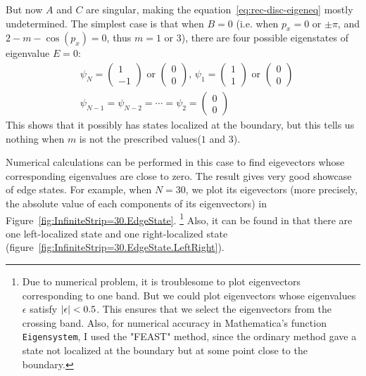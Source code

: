 \documentclass{article}
\begin{document}
    But now $A$ and $C$ are singular, making the
    equation~\ref{eq:rec-disc-eigeneq} mostly undetermined. The simplest case is
    that when $B=0$ (i.e. when $p_x=0$ or $\pm \pi$, and $2-m-\cos(p_x)=0$, thus
    $m=1$ or $3$), there are four possible eigenstates of eigenvalue $E=0$:
    \begin{align}
        &\psi_N = \begin{pmatrix}
            1 \\ -1
        \end{pmatrix}\text{ or } \begin{pmatrix}
            0 \\ 0
        \end{pmatrix},\,
        \psi_1 = \begin{pmatrix}
            1 \\ 1
        \end{pmatrix}\text{ or } \begin{pmatrix}
            0 \\ 0
        \end{pmatrix}\nonumber\\
        &\psi_{N-1}=\psi_{N-2} = \cdots = \psi_2 = \begin{pmatrix}
            0 \\ 0
        \end{pmatrix}
    \end{align}
    This shows that it possibly has states localized at the boundary, but this
    tells us nothing when $m$ is not the prescribed values($1$ and $3$).

    Numerical calculations can be performed in this case to find eigevectors
    whose corresponding eigenvalues are close to zero. The result gives very
    good showcase of edge states. For example, when $N=30$, we plot its
    eigevectors (more precisely, the absolute value of each components of its
    eigenvectors) in Figure~\ref{fig:InfiniteStrip=30.EdgeState}.
    \footnote{Due to numerical problem, it is troublesome to plot eigenvectors
        corresponding to one band. But we could plot eigenvectors whose
        eigenvalues $\epsilon$ satisfy $\abs{\epsilon}<0.5$. This ensures that
        we select the eigenvectors from the crossing band. Also, for numerical
        accuracy in Mathematica's function \texttt{Eigensystem}, I used the "FEAST"
        method, since the ordinary method gave a state not localized at the boundary but
        at some point close to the boundary.}
    Also, it can be found in that there are one left-localized state and one right-localized state
    (figure~\ref{fig:InfiniteStrip=30.EdgeState.LeftRight}).
\end{document}
